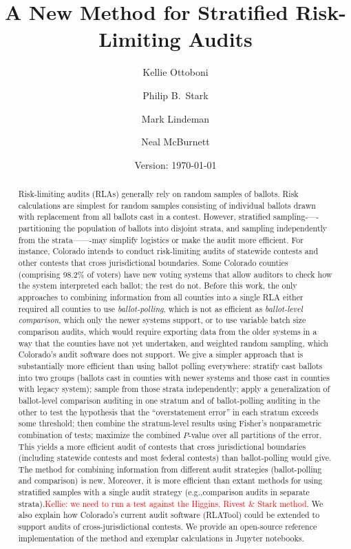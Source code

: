 \documentclass[runningheads]{llncs}
\title{A New Method for Stratified Risk-Limiting Audits}
\author{
   Kellie Ottoboni\inst{1}\orcidID{0000-0002-9107-3402} \and
   Philip B.~Stark\inst{1}\orcidID{0000-0002-3771-9604} \and
   Mark Lindeman\inst{2}\orcidID{0000-0001-8815-815X} \and
   Neal McBurnett\orcidID{0000-0001-8667-1830} 
}
\institute{
Department of Statistics, University of California, Berkeley, CA, USA \and
Department of Political Science, Columbia University, NY, USA and Verified Voting Foundation}
\date{Version: \today}
\newcommand{\comment}[1]{\textcolor{red}{\sc #1}}
\begin{document}
\maketitle


\begin{abstract}
Risk-limiting audits (RLAs) generally rely on random samples of ballots.
Risk calculations are simplest for random samples consisting of individual ballots drawn with replacement from all ballots cast in a contest.
However, stratified sampling-—-partitioning the population of ballots into disjoint
strata, and sampling independently from the strata——-may simplify logistics or make the audit more efficient.
For instance, Colorado intends to conduct risk-limiting audits of statewide contests and other contests that cross jurisdictional boundaries.
Some Colorado counties (comprising 98.2\% of voters)
have new voting systems that allow auditors to check how the system interpreted each ballot; the rest do not.
Before this work, the only approaches to combining information
from all counties into a single RLA either required all counties to 
use \emph{ballot-polling}, which is not as efficient as \emph{ballot-level comparison}, which only the newer systems support, or to use
variable batch size comparison audits, which would require exporting data from the older systems in a way that the counties have not yet undertaken, and weighted random sampling, which Colorado's audit software does not support.
We give a simpler approach that is substantially more efficient than using ballot polling everywhere: stratify cast ballots into two groups (ballots cast in counties with newer systems and those cast in counties with legacy system); sample from those strata independently; apply a generalization of ballot-level comparison auditing in one stratum and of ballot-polling auditing in the other to test the hypothesis that the ``overstatement error'' in each stratum exceeds some threshold; then combine the stratum-level results using Fisher's nonparametric combination of tests; maximize the combined $P$-value over all partitions of the error.
This yields a more efficient audit of contests that cross jurisdictional boundaries (including statewide contests and most federal contests) than ballot-polling would give.
The method for combining information from different audit strategies (ballot-polling and comparison) is new.
Moreover, it is more efficient than extant methods for using stratified samples with a single audit strategy
(e.g.,comparison audits in separate strata).\comment{Kellie: we need to run a test against the Higgins, Rivest \& Stark method}.
We also explain how Colorado's current audit software (RLATool) could be extended to support audits of cross-jurisdictional contests. 
We provide an open-source reference implementation of the method and exemplar calculations in Jupyter notebooks.


\end{abstract}
\end{document}
